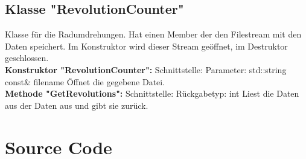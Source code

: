 \documentclass[12pt,a4paper]{article}
\begin{document}
\subsection {Klasse "RevolutionCounter"}
Klasse für die Radumdrehungen. Hat einen Member der den Filestream mit den Daten speichert. Im Konstruktor wird dieser Stream geöffnet, im Destruktor geschlossen.
\\

\textbf {Konstruktor "RevolutionCounter": } 
\newline
Schnittstelle:
\newline
Parameter: std::string const\& filename
\newline
Öffnet die gegebene Datei.
\\

\textbf {Methode "GetRevolutions": } 
\newline
Schnittstelle:
\newline
Rückgabetyp: int
\newline
Liest die Daten aus der Daten aus und gibt sie zurück.
\\

\newpage
\section {Source Code}



\newpage


\newpage

\newpage


\newpage


\newpage

\newpage


\newpage

\newpage


\newpage

\newpage


\newpage

\newpage


\newpage
\end{document}
